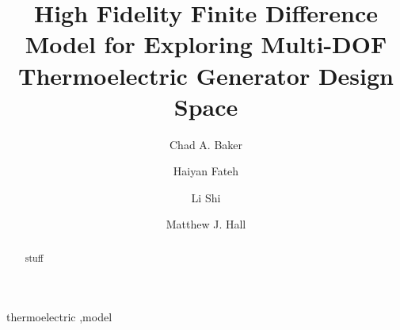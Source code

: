 \documentclass[preprint,authoryear,12pt]{elsarticle}
\begin{document}
\begin{frontmatter}



  \title{High Fidelity Finite Difference Model for Exploring Multi-DOF Thermoelectric Generator Design Space}


\author[UT]{Chad A. Baker}  
\author[UT]{Haiyan Fateh}  
\author[UT]{Li Shi}  
\author[UT]{Matthew J. Hall}

\address[UT]{Mechanical Engineering \\ University of Texas \\ 1 University
  Station, C2200 \\ Austin, TX 78712} 

\begin{abstract}
  stuff
\end{abstract}

\begin{keyword}
thermoelectric \sep model


\end{keyword}

\end{frontmatter}



\end{document}
